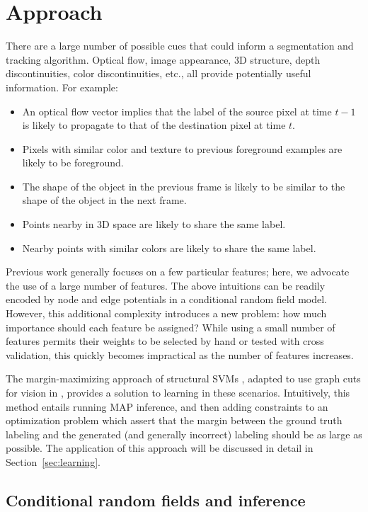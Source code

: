 \documentclass[graybox]{svmult}
\begin{document}
\section{Approach}

There are a large number of possible cues that could inform a segmentation and tracking algorithm.  Optical flow, image appearance, 3D structure, depth discontinuities, color discontinuities, etc., all provide potentially useful information.  For example:
\begin{itemize}
  \item An optical flow vector implies that the label of the source pixel at time $t-1$ is likely to propagate to that of the destination pixel at time $t$.
\item Pixels with similar color and texture to previous foreground examples are likely to be foreground.
\item The shape of the object in the previous frame is likely to be similar to the shape of the object in the next frame.
\item Points nearby in 3D space are likely to share the same label.
\item Nearby points with similar colors are likely to share the same label.
\end{itemize}

Previous work generally focuses on a few particular features; here, we advocate the use of a large number of features.  The above intuitions can be readily encoded by node and edge potentials in a conditional random field model.  However, this additional complexity introduces a new problem: how much importance should each feature be assigned?  While using a small number of features permits their weights to be selected by hand or tested with cross validation, this quickly becomes impractical as the number of features increases.

The margin-maximizing approach of structural SVMs \cite{taskar2005a, tsochantaridis2005a}, adapted to use graph cuts for vision in \cite{szummer2008a}, provides a solution to learning in these scenarios.  Intuitively, this method entails running MAP inference, and then adding constraints to an optimization problem which assert that the margin between the ground truth labeling and the generated (and generally incorrect) labeling should be as large as possible.  The application of this approach will be discussed in detail in Section~\ref{sec:learning}.


\subsection{Conditional random fields and inference}
\label{sec:inference}
\end{document}
